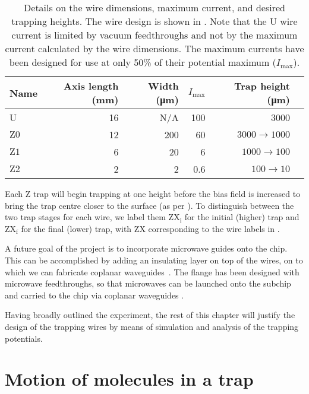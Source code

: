 \begin{table}
  \centering
\begin{tabular}{lrrrrr}
  Name & Axis length (\si{\milli\meter}) & Width (\si{\micro\meter})& $I_\text{max}$ & Trap height (\si{\micro\meter}) \\
 \hline
  U & 16 & N/A& 100 & 3000\\
  $\mathrm{Z0}$ & 12 & 200& 60& $3000\rightarrow1000$ \\
  $\mathrm{Z1}$ &  6 & 20& 6& $1000\rightarrow100$ \\
  $\mathrm{Z2}$ &  2 & 2& 0.6& $100\rightarrow10$ \\
 \hline
\end{tabular}
  \caption{Details on the wire dimensions, maximum current, and desired
  trapping heights. The wire design is shown in
  . Note that the U wire current is
  limited by vacuum feedthroughs and not by the maximum current calculated by
  the wire dimensions.  The maximum currents have been designed for use at only
  50\% of their potential maximum ($I_\text{max}$).
  }
  \label{design:table:wires}
\end{table}

Each Z trap will begin trapping at one height before the bias field is
increased to bring the trap centre closer to the surface (as per
).  To distinguish between the two trap stages for
each wire, we label them $\mathrm{ZX_i}$ for the initial (higher) trap and
$\mathrm{ZX_f}$ for the final (lower) trap, with $\mathrm{ZX}$ corresponding to
the wire labels in .

A future goal of the project is to incorporate microwave guides onto the chip. This can be
accomplished by adding an insulating layer on top of the wires, on to which we
can fabricate coplanar waveguides~\cite{1127105}. The flange has been designed
with microwave feedthroughs, so that microwaves can be launched onto the
subchip and carried to the chip via coplanar waveguides .

Having broadly outlined the experiment, the rest of this chapter will justify
the design of the trapping wires by means of simulation and analysis
of the trapping potentials.

\section{Motion of molecules in a trap}
\label{design:motion}

